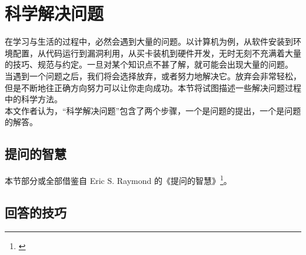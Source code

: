 \section{科学解决问题}\label{sec:solving}
    在学习与生活的过程中，必然会遇到大量的问题。以计算机为例，从软件安装到环境配置，从代码运行到漏洞利用，从买卡装机到硬件开发，无时无刻不充满着大量的技巧、规范与约定。一旦对某个知识点不甚了解，就可能会出现大量的问题。\\
    当遇到一个问题之后，我们将会选择放弃，或者努力地解决它。放弃会非常轻松，但是不断地往正确方向努力可以让你走向成功。本节将试图描述一些解决问题过程中的科学方法。\\
    本文作者认为，“科学解决问题”包含了两个步骤，一个是问题的提出，一个是问题的解答。\\
    \subsection{提问的智慧}\label{subsec:solving/asking}
        本节部分或全部借鉴自 Eric S. Raymond 的《提问的智慧》\footnote{\cite{esr}}。\\

    \subsection{回答的技巧}\label{subsec:solving/answering}
